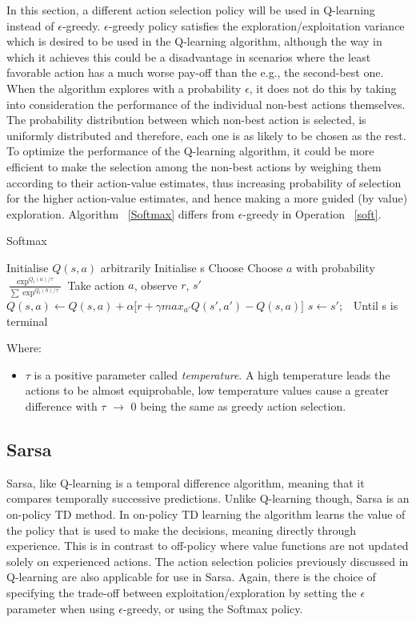 \documentclass[11pt]{article}
\begin{document}
In this section, a different action selection policy will be used in Q-learning instead of $\epsilon$-greedy. $\epsilon$-greedy policy satisfies the exploration/exploitation variance which is desired to be used in the Q-learning algorithm, although the way in which it achieves this could be a disadvantage in scenarios where the least favorable action has a much worse pay-off than the e.g., the second-best one. When the algorithm explores with a probability $\epsilon$, it does not do this by taking into consideration the performance of the individual non-best actions themselves. The probability distribution between which non-best action is selected, is uniformly distributed and therefore, each one is as likely to be chosen as the rest. To optimize the performance of the Q-learning algorithm, it could be more efficient to make the selection among the non-best actions by weighing them according to their action-value estimates, thus increasing probability of selection for the higher action-value estimates, and hence making a more guided (by value) exploration.
Algorithm ~\ref{Softmax} differs from $\epsilon$-greedy in Operation ~\ref{soft}.

\begin{algorithm}
\caption{Softmax}
\begin{algorithmic}[1]
\label{Softmax}
\STATE Initialise $Q(s,a)$ arbitrarily
\STATE Initialise s
\STATE Choose Choose $a$ with probability $\frac{\exp^{Q_t(a)/\tau}}{\sum{\exp^{Q_t(b)/\tau}}}$ \label{soft}
\STATE Take action $a$, observe $r$, $s'$
\STATE $Q(s,a) \leftarrow Q(s,a) + \alpha \lbrack r + \gamma max_{a'} Q(s',a') - Q(s,a)\rbrack$
\STATE $s \leftarrow s';$\
\ENDFOR
\STATE Until s is terminal
\ENDFOR
\end{algorithmic}
\end{algorithm}

\noindent Where:
\begin{itemize}
	\item $\tau$ is a positive parameter called \emph{temperature}. A high temperature leads the actions to be almost equiprobable, low temperature values cause a greater difference with $\tau$ $\rightarrow$ 0 being the same as greedy action selection.
\end{itemize}
\vspace*{10mm}


\subsection{Sarsa}
Sarsa, like Q-learning is a temporal difference algorithm, meaning that it compares temporally successive predictions. Unlike Q-learning though, Sarsa is an on-policy TD method. In on-policy TD learning the algorithm learns the value of the policy that is used to make the decisions, meaning directly through experience. This is in contrast to off-policy where value functions are not updated solely on experienced actions. The action selection policies previously discussed in Q-learning are also applicable for use in Sarsa. Again, there is the choice of specifying the trade-off between exploitation/exploration by setting the $\epsilon$ parameter when using $\epsilon$-greedy, or using the Softmax policy.
\end{document}

